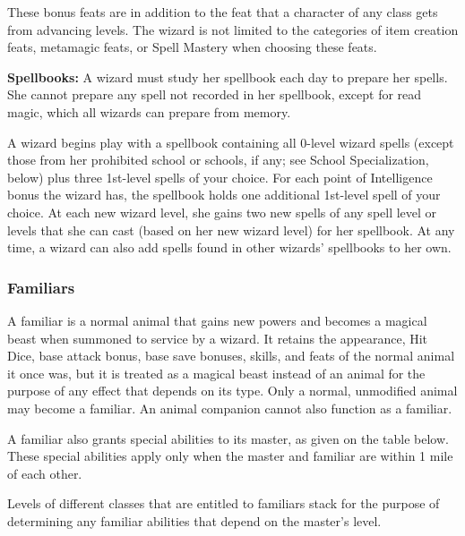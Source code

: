 These bonus feats are in addition to the feat that a character of any class gets from advancing levels. The wizard is not limited to the categories of item creation feats, metamagic feats, or Spell Mastery when choosing these feats.

\textbf{Spellbooks:} A wizard must study her spellbook each day to prepare her spells. She cannot prepare any spell not recorded in her spellbook, except for read magic, which all wizards can prepare from memory.

A wizard begins play with a spellbook containing all 0-level wizard spells (except those from her prohibited school or schools, if any; see School Specialization, below) plus three 1st-level spells of your choice. For each point of Intelligence bonus the wizard has, the spellbook holds one additional 1st-level spell of your choice. At each new wizard level, she gains two new spells of any spell level or levels that she can cast (based on her new wizard level) for her spellbook. At any time, a wizard can also add spells found in other wizards' spellbooks to her own.

\subsubsection{Familiars}
A familiar is a normal animal that gains new powers and becomes a magical beast when summoned to service by a wizard. It retains the appearance, Hit Dice, base attack bonus, base save bonuses, skills, and feats of the normal animal it once was, but it is treated as a magical beast instead of an animal for the purpose of any effect that depends on its type. Only a normal, unmodified animal may become a familiar. An animal companion cannot also function as a familiar.

A familiar also grants special abilities to its master, as given on the table below. These special abilities apply only when the master and familiar are within 1 mile of each other.

Levels of different classes that are entitled to familiars stack for the purpose of determining any familiar abilities that depend on the master's level.


